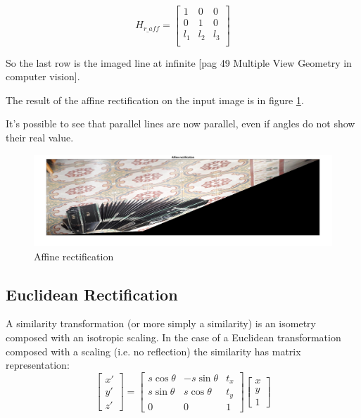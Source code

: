 \documentclass[11pt, oneside]{article}   	%
\begin{document}
\begin{equation}
H_{r\_aff} =\begin{bmatrix} 
1& 0 & 0 \\
0 &  1 & 0 \\
l_1 &  l_2 & l_3 \\
\end{bmatrix}
\end{equation}

So the last row is the imaged line at infinite [pag 49 Multiple View Geometry in computer vision].

The result of the affine rectification on the input image is in figure  {\ref{affine}}.

It's possible to see that parallel lines are now parallel, even if angles do not show their real value.

\begin{figure}
\includegraphics[width=0.8\linewidth]{affine_rectification.jpg}
\caption{Affine rectification}
\label{affine}
\end{figure}

\subsection{Euclidean Rectification} \label{seceucl}
A similarity transformation (or more simply a similarity) is an isometry composed with an isotropic scaling. In the case of a Euclidean transformation composed with a scaling (i.e. no reflection) the similarity has matrix representation:
\begin{equation}
\begin{bmatrix}
x' \\ y' \\ z'
\end{bmatrix}
=
\begin{bmatrix}
s \cos\theta & - s \sin\theta & t_x \\ s \sin\theta & s \cos\theta & t_y \\ 0 & 0 & 1
\end{bmatrix}
\begin{bmatrix}
x \\ y \\ 1
\end{bmatrix}
\end{equation}
\end{document}

